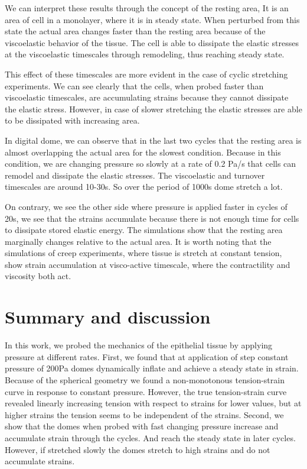 We can interpret these results through the concept of the resting area,
It is an area of cell in a monolayer, where it is in steady state. When
perturbed from this state the actual area changes faster than the
resting area because of the viscoelastic behavior of the tissue. The
cell is able to dissipate the elastic stresses at the viscoelastic
timescales through remodeling, thus reaching steady state.

This effect of these timescales are more evident in the case of cyclic
stretching experiments. We can see clearly that the cells, when probed
faster than viscoelastic timescales, are accumulating strains because
they cannot dissipate the elastic stress. However, in case of slower
stretching the elastic stresses are able to be dissipated with
increasing area.

In digital dome, we can observe that in the last two cycles that the
resting area is almost overlapping the actual area for the slowest
condition. Because in this condition, we are changing pressure so slowly
at a rate of 0.2 Pa/s that cells can remodel and dissipate the elastic
stresses. The viscoelastic and turnover timescales are around 10-30s. So
over the period of 1000s dome stretch a lot.

On contrary, we see the other side where pressure is applied faster in
cycles of 20s, we see that the strains accumulate because there is not
enough time for cells to dissipate stored elastic energy. The
simulations show that the resting area marginally changes relative to
the actual area. It is worth noting that the simulations of creep
experiments, where tissue is stretch at constant tension, show strain
accumulation at visco-active timescale, where the contractility and
viscosity both act.

\newpage

\hypertarget{summary-and-discussion}{%
\section{Summary and discussion}\label{summary-and-discussion}}

In this work, we probed the mechanics of the epithelial tissue by
applying pressure at different rates. First, we found that at
application of step constant pressure of 200Pa domes dynamically inflate
and achieve a steady state in strain. Because of the spherical geometry
we found a non-monotonous tension-strain curve in response to constant
pressure. However, the true tension-strain curve revealed linearly
increasing tension with respect to strains for lower values, but at
higher strains the tension seems to be independent of the strains.
Second, we show that the domes when probed with fast changing pressure
increase and accumulate strain through the cycles. And reach the steady
state in later cycles. However, if stretched slowly the domes stretch to
high strains and do not accumulate strains.

